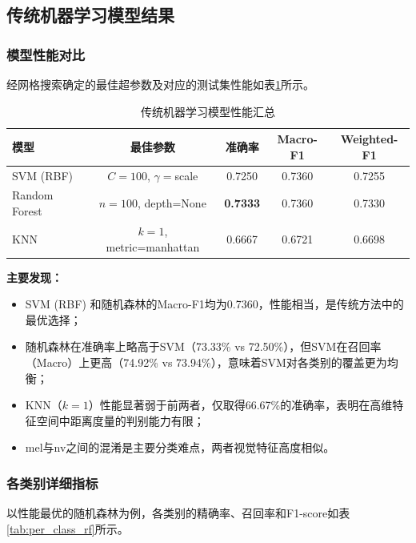 \documentclass[UTF8,a4paper,12pt]{ctexart}
\numberwithin{figure}{section}
\numberwithin{table}{section}
\begin{document}
\subsection{传统机器学习模型结果}

\subsubsection{模型性能对比}

经网格搜索确定的最佳超参数及对应的测试集性能如表\ref{tab:ml_results}所示。

\begin{table}[H]
\centering
\caption{传统机器学习模型性能汇总}
\label{tab:ml_results}
\small
\begin{tabular}{lcccc}
\toprule
\textbf{模型} & \textbf{最佳参数} & \textbf{准确率} & \textbf{Macro-F1} & \textbf{Weighted-F1} \\
\midrule
SVM (RBF)    & $C{=}100$, $\gamma{=}$scale & 0.7250 & 0.7360 & 0.7255 \\
Random Forest & $n{=}100$, depth=None    & \textbf{0.7333} & 0.7360 & 0.7330 \\
KNN          & $k{=}1$, metric=manhattan & 0.6667 & 0.6721 & 0.6698 \\
\bottomrule
\end{tabular}
\end{table}

\textbf{主要发现：}
\begin{itemize}
    \item SVM (RBF) 和随机森林的Macro-F1均为0.7360，性能相当，是传统方法中的最优选择；
    \item 随机森林在准确率上略高于SVM（73.33\% vs 72.50\%），但SVM在召回率（Macro）上更高（74.92\% vs 73.94\%），意味着SVM对各类别的覆盖更为均衡；
    \item KNN（$k=1$）性能显著弱于前两者，仅取得66.67\%的准确率，表明在高维特征空间中距离度量的判别能力有限；
    \item mel与nv之间的混淆是主要分类难点，两者视觉特征高度相似。
\end{itemize}

\subsubsection{各类别详细指标}

以性能最优的随机森林为例，各类别的精确率、召回率和F1-score如表\ref{tab:per_class_rf}所示。
\end{document}
